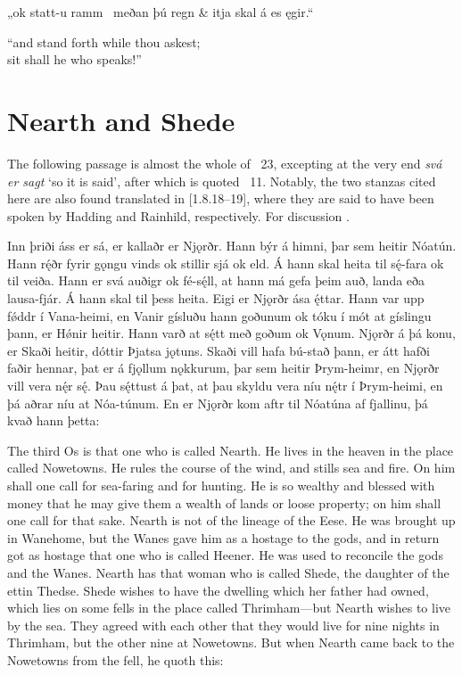 \bvg\bva „ok statt-u ramm \hld\ meðan þú regn &
\ind {}itja skal á es ęgir.“\eva

\bvb “and stand forth while thou askest; \\
\ind sit shall he who speaks!”\evb\evg

\sectionline

\section{Nearth and Shede}

The following passage is almost the whole of \Gylfaginning\ 23, excepting at the very end \emph{svá er sagt} ‘so it is said’, after which is quoted \Grimnismal\ 11.
Notably, the two stanzas cited here are also found translated in \textcite{Saxo}[1.8.18--19], where they are said to have been spoken by Hadding and Rainhild, respectively.  For discussion \textcite{Hopkins2021}.

\sectionline

\bpg\bpa Inn þriði áss er sá, er kallaðr er Njǫrðr. Hann býr á himni, þar sem heitir Nóatún. Hann rę́ðr fyrir gǫngu vinds ok stillir sjá ok eld. Á hann skal heita til sę́-fara ok til veiða. Hann er svá auðigr ok fé-sę́ll, at hann má gefa þeim auð, landa eða lausa-fjár. Á hann skal til þess heita. Eigi er Njǫrðr ása ę́ttar. Hann var upp fǿddr í Vana-heimi, en Vanir gísluðu hann goðunum ok tóku í mót at gíslingu þann, er Hǿnir heitir. Hann varð at sę́tt með goðum ok Vǫnum. Njǫrðr á þá konu, er Skaði heitir, dóttir Þjatsa jǫtuns. Skaði vill hafa bú-stað þann, er átt hafði faðir hennar, þat er á fjǫllum nǫkkurum, þar sem heitir Þrym-heimr, en Njǫrðr vill vera nę́r sę́. Þau sę́ttust á þat, at þau skyldu vera níu nę́tr í Þrym-heimi, en þá aðrar níu at Nóa-túnum. En er Njǫrðr kom aftr til Nóatúna af fjallinu, þá kvað hann þetta:\epa

\bpb The third Os is that one who is called Nearth. He lives in the heaven in the place called Nowetowns. He rules the course of the wind, and stills sea and fire. On him shall one call for sea-faring and for hunting. He is so wealthy and blessed with money that he may give them a wealth of lands or loose property; on him shall one call for that sake. Nearth is not of the lineage of the Eese. He was brought up in Wanehome, but the Wanes gave him as a hostage to the gods, and in return got as hostage that one who is called Heener. He was used to reconcile the gods and the Wanes. Nearth has that woman who is called Shede, the daughter of the ettin Thedse. Shede wishes to have the dwelling which her father had owned, which lies on some fells in the place called Thrimham—but Nearth wishes to live by the sea. They agreed with each other that they would live for nine nights in Thrimham, but the other nine at Nowetowns. But when Nearth came back to the Nowetowns from the fell, he quoth this:\epb\epg

